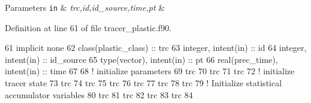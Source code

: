 \begin{DoxyParams}[1]{Parameters}
\mbox{\tt in}  & {\em trc,id,id\+\_\+source,time,pt} & \\
\hline
\end{DoxyParams}


Definition at line 61 of file tracer\+\_\+plastic.\+f90.


\begin{DoxyCode}
61     \textcolor{keywordtype}{implicit none}
62     \textcolor{keywordtype}{class}(plastic\_class) :: trc
63     \textcolor{keywordtype}{integer}, \textcolor{keywordtype}{intent(in)} :: id
64     \textcolor{keywordtype}{integer}, \textcolor{keywordtype}{intent(in)} :: id\_source
65     \textcolor{keywordtype}{type}(vector), \textcolor{keywordtype}{intent(in)} :: pt
66     \textcolor{keywordtype}{real(prec\_time)}, \textcolor{keywordtype}{intent(in)} :: time
67 
68     \textcolor{comment}{! initialize parameters}
69     trc%
70     trc%
71     trc%
72     \textcolor{comment}{! initialize tracer state}
73     trc%
74     trc%
75     trc%
76     trc%
77     trc%
78     trc%
79     \textcolor{comment}{! Initialize statistical accumulator variables}
80     trc%
81     trc%
82     trc%
83     trc%
84 
\end{DoxyCode}
